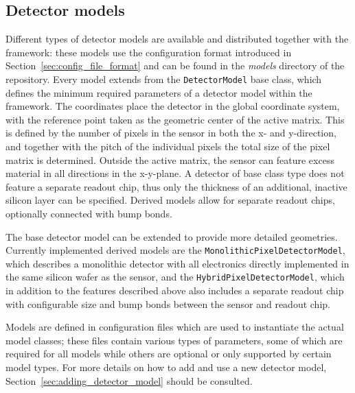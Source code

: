 \subsection{Detector models}
\label{sec:detector_models}
Different types of detector models are available and distributed together with the framework: these models use the configuration format introduced in Section~\ref{sec:config_file_format} and can be found in the \textit{models} directory of the repository.
Every model extends from the \texttt{DetectorModel} base class, which defines the minimum required parameters of a detector model within the framework.
The coordinates place the detector in the global coordinate system, with the reference point taken as the geometric center of the active matrix.
This is defined by the number of pixels in the sensor in both the x- and y-direction, and together with the pitch of the individual pixels the total size of the pixel matrix is determined.
Outside the active matrix, the sensor can feature excess material in all directions in the x-y-plane.
A detector of base class type does not feature a separate readout chip, thus only the thickness of an additional, inactive silicon layer can be specified.
Derived models allow for separate readout chips, optionally connected with bump bonds.

The base detector model can be extended to provide more detailed geometries.
Currently implemented derived models are the \texttt{MonolithicPixelDetectorModel}, which describes a monolithic detector with all electronics directly implemented in the same silicon wafer as the sensor, and the \texttt{HybridPixelDetectorModel}, which in addition to the features described above also includes a separate readout chip with configurable size and bump bonds between the sensor and readout chip.

Models are defined in configuration files which are used to instantiate the actual model classes; these files contain various types of parameters, some of which are required for all models while others are optional or only supported by certain model types.
For more details on how to add and use a new detector model, Section~\ref{sec:adding_detector_model} should be consulted.

